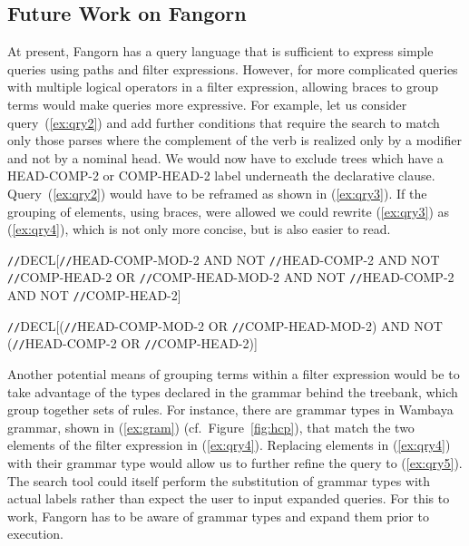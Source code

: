 \documentclass[12pt]{article}
\begin{document}

\subsection{Future Work on Fangorn}
\label{sec:fangorn-fut}


At present, Fangorn has a query language that is sufficient to express
simple queries using paths and filter expressions. However, for more complicated 
queries with multiple logical operators in a filter expression, allowing
braces to group terms would make queries more expressive.
For example, let us consider query~(\ref{ex:qry2})
and add further conditions that require the search to match only those parses 
where the complement of the verb is realized only by a modifier and not by a
nominal head. We would now have to exclude trees which have a {\small HEAD-COMP-2}
or {\small COMP-HEAD-2} label underneath the declarative clause. Query~(\ref{ex:qry2})
would have to be reframed as shown in (\ref{ex:qry3}). If the grouping of elements,
using braces, were allowed we could rewrite (\ref{ex:qry3}) as (\ref{ex:qry4}), 
which is not only more concise, but is also easier to read. 

\begin{exe}
\ex\label{ex:qry3}\small
\verb=//=DECL[\verb=//=HEAD-COMP-MOD-2 AND NOT \verb=//=HEAD-COMP-2 AND NOT \verb=//=COMP-HEAD-2 OR \verb=//=COMP-HEAD-MOD-2  AND NOT \verb=//=HEAD-COMP-2 AND NOT \verb=//=COMP-HEAD-2]
\end{exe}
\begin{exe}
\ex\label{ex:qry4}\small
\verb=//=DECL[(\verb=//=HEAD-COMP-MOD-2 OR \verb=//=COMP-HEAD-MOD-2) AND NOT (\verb=//=HEAD-COMP-2 OR \verb=//=COMP-HEAD-2)]
\end{exe}

Another potential means of grouping terms within a filter expression
would be to take advantage of the types declared in the grammar behind
the treebank, which group together sets of rules.
For instance, there are grammar types in Wambaya grammar, shown in (\ref{ex:gram}) (cf.\ Figure~\ref{fig:hcp}), that 
match the two elements of the filter expression in (\ref{ex:qry4}). Replacing elements in (\ref{ex:qry4}) with their grammar type would allow us to further refine the query to (\ref{ex:qry5}). 
The search tool could itself perform the substitution of grammar types with actual labels 
rather than expect the user to input expanded queries. For this to work, Fangorn 
has to be aware of grammar types and expand them prior to execution.
\end{document}
